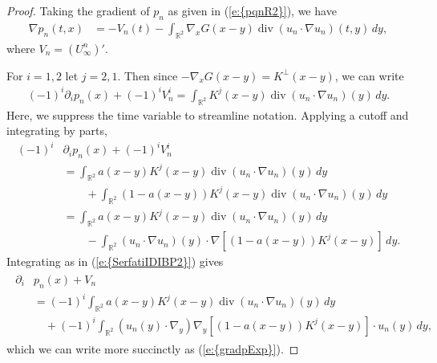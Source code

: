 \documentclass[reqno,openright,11pt,twoside]{amsart}
\theoremstyle{definition}
\numberwithin{equation}{section}
\begin{document}
\begin{proof}
Taking the gradient of $p_n$ as given in {(\ref{e:{pqnR2}})}, we have
\begin{align*}
	{\ensuremath{\nabla}} p_n(t, x)
		&= - V_n(t)
			- \int_{{\ensuremath{{\ensuremath{\mathbb{{R}}}}}}^2} {\ensuremath{\nabla}}_x G(x - y) \operatorname{div}(u_n \cdot {\ensuremath{\nabla}} u_n)(t, y) \, dy,
\end{align*}
where $V_n = (U_{\ensuremath{\infty}}^n)'$.

For $i = 1, 2$ let $j = 2, 1$. Then since $- {\ensuremath{\nabla}}_x G(x - y) = K^\perp(x - y)$, we can write 
\begin{align*}
	(-1)^i {\ensuremath{\partial}}_i p_n(x) + (-1)^i V_n^i
		=  \int_{{\ensuremath{{\ensuremath{\mathbb{{R}}}}}}^2} K^j(x - y) \operatorname{div}(u_n \cdot {\ensuremath{\nabla}} u_n)(y) \, dy.
\end{align*}
Here, we suppress the time variable to streamline notation.
Applying a cutoff and integrating by parts,
\begin{align*}
	(-1)^i &{\ensuremath{\partial}}_i p_n(x) + (-1)^i V_n^i \\
		&= \int_{{\ensuremath{{\ensuremath{\mathbb{{R}}}}}}^2} a(x - y) K^j(x - y) \operatorname{div}(u_n \cdot {\ensuremath{\nabla}} u_n)(y) \, dy \\
		&\qquad
			+ \int_{{\ensuremath{{\ensuremath{\mathbb{{R}}}}}}^2} (1 - a(x - y)) K^j(x - y)
			        \operatorname{div}(u_n \cdot {\ensuremath{\nabla}} u_n)(y) \, dy \\
		&= \int_{{\ensuremath{{\ensuremath{\mathbb{{R}}}}}}^2} a(x - y) K^j(x - y) \operatorname{div}(u_n \cdot {\ensuremath{\nabla}} u_n)(y) \, dy \\
		&\qquad
	 		- \int_{{\ensuremath{{\ensuremath{\mathbb{{R}}}}}}^2} (u_n \cdot {\ensuremath{\nabla}} u_n)(y)
			\cdot {\ensuremath{\nabla}} {\ensuremath{\left[ {(1 - a(x - y)) K^j(x - y)} \right]}} \, dy.
\end{align*}
Integrating as in {(\ref{e:{SerfatiIDIBP2}})} gives
\begin{align*}
	\begin{split}
	{\ensuremath{\partial}}_i &p_n(x) + V_n \\
		&= (-1)^i \int_{{\ensuremath{{\ensuremath{\mathbb{{R}}}}}}^2} a(x - y) K^j(x - y)
		    \operatorname{div}(u_n \cdot {\ensuremath{\nabla}} u_n)(y) \, dy \\
		&\quad
	 		+ (-1)^i \int_{{\ensuremath{{\ensuremath{\mathbb{{R}}}}}}^2} (u_n(y) \cdot {\ensuremath{\nabla}}_y)
			{\ensuremath{\nabla}}_y {\ensuremath{\left[ {(1 - a(x - y)) K^j(x - y)} \right]}}
			\cdot u_n(y) \, dy,
	\end{split}
\end{align*}
which we can write more succinctly as {(\ref{e:{gradpExp}})}.


\end{proof}
\end{document}
